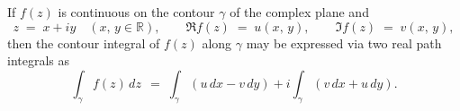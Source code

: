\documentclass[12pt]{article}
\theoremstyle{definition}
\begin{document}
If $f(z)$ is continuous on the contour $\gamma$ of the complex plane and
$$z \;=\; x\!+\!iy \quad (x,\,y \in \mathbb{R}), \qquad\Re{f(z)} \;=\; u(x,\,y), \qquad \Im{f(z)} \;=\; v(x,\,y),$$
then the contour integral of $f(z)$ along $\gamma$ may be expressed via two real path integrals as
$$\int_{\gamma}f(z)\,dz \,\;=\; \int_{\gamma}(u\,dx-v\,dy)+i\!\int_{\gamma}(v\,dx+u\,dy).$$
\end{document}
